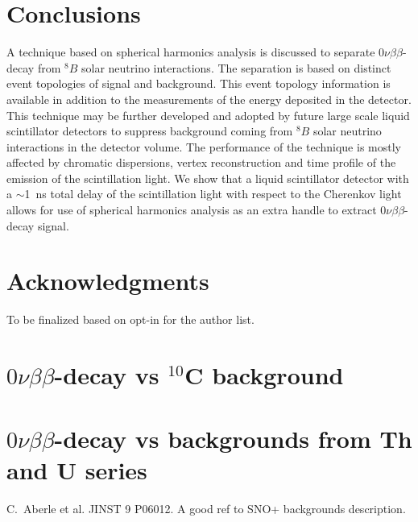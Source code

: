 \documentclass[12pt,twoside,letterpaper]{article}
\newcommand{\vbb}{0\nu\beta\beta}
\newcommand{\B}{^{8}B}
\begin{document}
\section{Conclusions}
A technique based on spherical harmonics analysis is discussed to separate $\vbb$-decay from $\B$ solar neutrino interactions. The separation is based on distinct event topologies of signal and background. This event topology information is available in addition to the measurements of the energy deposited in the detector. This technique may be further developed and adopted by future large scale liquid scintillator detectors to suppress background coming from $\B$ solar neutrino interactions in the detector volume. The performance of the technique is mostly affected by chromatic dispersions, vertex reconstruction and time profile of the emission of the scintillation light. We show that a liquid scintillator detector with a $\sim$1~ns total delay of the scintillation light with respect to the Cherenkov light allows for use of spherical harmonics analysis as an extra handle to extract $\vbb$-decay signal.


\section{Acknowledgments}
To be finalized based on opt-in for the author list.


\appendix

\section{$\vbb$-decay vs $^{10}$C background}
\section{$\vbb$-decay vs backgrounds from Th and U series}

\begin{thebibliography}{00}
 C.~Aberle et al. JINST 9 P06012.
 A good ref to SNO+ backgrounds description.
\end{thebibliography}
\end{document}
